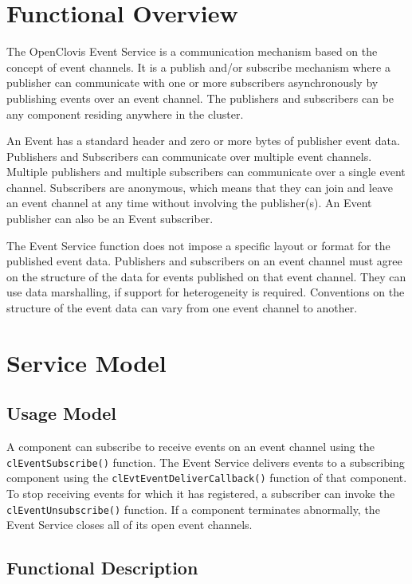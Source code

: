 \hypertarget{group__group20}{
\chapter{Functional Overview}
\label{group__group20}
}

\begin{flushleft}
The OpenClovis Event Service is a communication mechanism based on the concept of event channels. It is a publish and/or subscribe mechanism where a 
publisher can communicate with one or more subscribers asynchronously by publishing events over an event channel. The publishers and subscribers can be 
any component residing anywhere in the cluster.
\par
An Event has a standard header and zero or more bytes of publisher event data. Publishers and Subscribers can communicate over multiple event 
channels. Multiple publishers and multiple subscribers can communicate over a single event channel. Subscribers are anonymous, which means that they can 
join and leave an event channel at any time without involving the publisher(s). An Event publisher can also be an Event subscriber. 
\par
The Event Service function does not impose a specific layout or format for the published event data. Publishers and subscribers on an event channel must 
agree on the structure of the data for events published on that event channel. They can use data marshalling, if support for heterogeneity is required. 
Conventions on the structure of the event data can vary from one event channel to another. 

\chapter{Service Model}
\section{Usage Model}
A component can subscribe to receive events on an event channel using the {\tt{clEventSubscribe()}} function. The Event 
Service delivers events to a subscribing component using the {\tt{clEvtEventDeliverCallback()}} function of that component. To stop receiving 
events for which it has registered, a subscriber can invoke the {\tt{clEventUnsubscribe()}} function. If a component terminates abnormally, the Event 
Service closes all of its open event channels. 

\section{Functional Description}

\end{flushleft}
